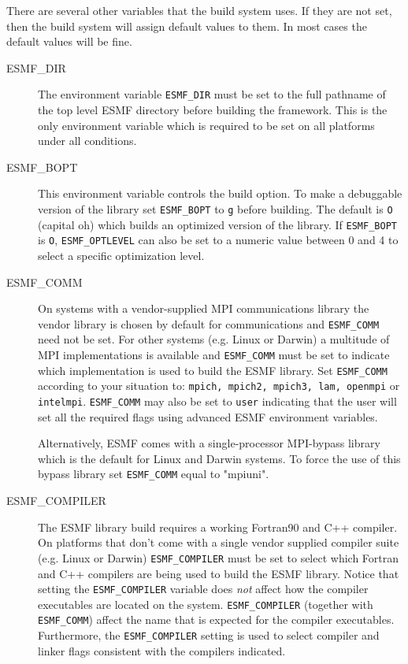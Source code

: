 \begin{itemize}
\begin{description}
\end{description}

There are several other variables that the build system uses.  If they
are not set, then the build system will assign default values to
them. In most cases the default values will be fine.

\begin{description}

\item[ESMF\_DIR]
The environment variable {\tt ESMF\_DIR} must be set to the full pathname 
of the top level ESMF directory before building the framework.  This is the 
only environment variable which is required to be set on all platforms under 
all conditions.

\item[ESMF\_BOPT]
This environment variable controls the build option. To make a debuggable
version of the library set {\tt ESMF\_BOPT} to {\tt g} before building. The
default is {\tt O} (capital oh) which builds an optimized version of the 
library. If {\tt ESMF\_BOPT} is {\tt O}, {\tt ESMF\_OPTLEVEL} can also be set
to a numeric value between 0 and 4 to select a specific optimization level.

\item[ESMF\_COMM]
On systems with a vendor-supplied MPI communications library the vendor library 
is chosen by default for communications and {\tt ESMF\_COMM} need not be set.
For other systems (e.g. Linux or Darwin) a multitude of MPI implementations is
available and {\tt ESMF\_COMM} must be set to indicate which implementation is
used to build the ESMF library. Set {\tt ESMF\_COMM} according to your situation
to: {\tt mpich, mpich2, mpich3, lam, openmpi} or {\tt intelmpi}. {\tt ESMF\_COMM} may
also be set to {\tt user} indicating that the user will set all the required
flags using advanced ESMF environment variables.

Alternatively, ESMF comes with a single-processor MPI-bypass library which is
the default for Linux and Darwin systems. To force the use of this bypass
library set {\tt ESMF\_COMM} equal to "mpiuni".

\item[ESMF\_COMPILER]
The ESMF library build requires a working Fortran90 and C++ compiler. On 
platforms that don't come with a single vendor supplied compiler suite
(e.g. Linux or Darwin) {\tt ESMF\_COMPILER} must be set to select which Fortran
and C++ compilers are being used to build the ESMF library. Notice that setting
the {\tt ESMF\_COMPILER} variable does {\em not} affect how the compiler
executables are located on the system. {\tt ESMF\_COMPILER} (together with
{\tt ESMF\_COMM}) affect the name that is expected for the compiler executables.
Furthermore, the {\tt ESMF\_COMPILER} setting is used to select compiler and
linker flags consistent with the compilers indicated.


\end{description}
\end{itemize}
